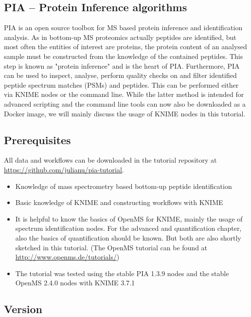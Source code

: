 \documentclass[a4paper,11pt,twoside]{article}
\begin{document}
\subsection{PIA -- Protein Inference algorithms}

PIA is an open source toolbox for MS based protein inference and identification
analysis. As in bottom-up MS proteomics actually peptides are identified, but
most often the entities of interest are proteins, the protein content of an
analysed sample must be constructed from the knowledge of the contained
peptides. This step is known as "protein inference" and is the heart of PIA.
Furthermore, PIA can be used to inspect, analyse, perform quality checks
on and filter identified peptide spectrum matches (PSMs) and peptides. This can
be performed either via KNIME nodes or the command line. While the latter
method is intended for advanced scripting and the command line tools can now
also be downloaded as a Docker image, we will mainly discuss the usage of KNIME
nodes in this tutorial.


\subsection{Prerequisites}

All data and workflows can be downloaded in the tutorial repository at\\
\url{https://github.com/julianu/pia-tutorial}.

\begin{itemize}
	\item Knowledge of mass spectrometry based bottom-up peptide identification
	\item Basic knowledge of KNIME and constructing workflows with KNIME

	\item It is helpful to know the basics of OpenMS for KNIME, mainly the usage
	of spectrum identification nodes. For the advanced and quantification chapter,
	also the basics of quantification should be known. But both are also shortly
	sketched in this tutorial. (The OpenMS tutorial can be found at
	\url{http://www.openms.de/tutorials/})

	\item The tutorial was tested using the stable PIA 1.3.9 nodes and the stable
	OpenMS 2.4.0 nodes with KNIME 3.7.1
\end{itemize}

\subsection{Version}
\end{document}
